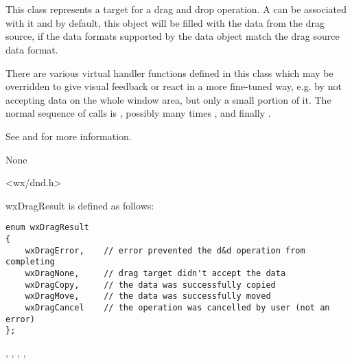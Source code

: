 \section{}\label{wxdroptarget}

This class represents a target for a drag and drop operation. A 
can be associated with it and by default, this object will be filled with the data from the
drag source, if the data formats supported by the data object match the drag source data 
format.

There are various virtual handler functions defined in this class which may be overridden
to give visual feedback or react in a more fine-tuned way, e.g. by not accepting data on
the whole window area, but only a small portion of it. The normal sequence of calls is
, possibly many times ,
 and finally .

See  and 
for more information.


None


<wx/dnd.h>


wxDragResult is defined as follows:

{\small\begin{verbatim}
enum wxDragResult
{
    wxDragError,    // error prevented the d&d operation from completing
    wxDragNone,     // drag target didn't accept the data
    wxDragCopy,     // the data was successfully copied
    wxDragMove,     // the data was successfully moved
    wxDragCancel    // the operation was cancelled by user (not an error)
};
\end{verbatim}
}


, 
, ,
, 


\label{wxdroptargetwxdroptarget}

